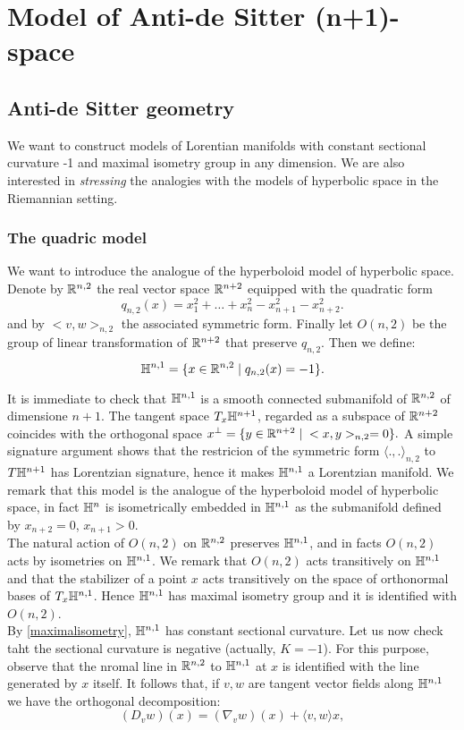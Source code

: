 \chapter{Model of Anti-de Sitter (n+1)-space}
\section{Anti-de Sitter geometry}
We want to construct models of Lorentian manifolds with constant sectional curvature -1 and maximal isometry group in any dimension. We are also interested in \textit{stressing} the analogies with the models of hyperbolic space in the Riemannian setting. 

\subsection{The quadric model}
We want to introduce the analogue of the hyperboloid model of hyperbolic space. Denote by $\mathbb{R}^{n,2}$ the real vector space $\mathbb{R}^{n+2}$ equipped with the quadratic form 
\[
    q_{n,2}(x)=x_1^{2}+\dots+x_n^{2}-x_{n+1}^{2}-x_{n+2}^2.   
\]
and by $<v,w>_{n,2}$ the associated symmetric form. Finally let $O(n,2)$ be the group of linear transformation of $\mathbb{R}^{n+2}$ that preserve $q_{n,2}.$
Then we define: 
\[
    \mathbb{H}^{n,1}=\{x\in \mathbb{R}^{n,2}\;|\;q_{n,2}(x)=-1\}.
\]

It is immediate to check that $\mathbb{H}^{n,1}$ is a smooth connected submanifold of $\mathbb{R}^{n,2}$ of dimensione $n+1$. The tangent space $T_x\mathbb{H}^{n+1}$, regarded as a subspace of $\mathbb{R}^{n+2}$ coincides with the orthogonal space $x^{\perp}=\{y\in \mathbb{R}^{n+2}\;|\;<x,y>_{n,2}=0\}.$ A simple signature argument shows that the restricion of the symmetric form $\langle .,. \rangle_{n,2}$ to $T\mathbb{H}^{n+1}$ has Lorentzian signature, hence it makes $\mathbb{H}^{n,1}$ a Lorentzian manifold. We remark that this model is the analogue of the hyperboloid model of hyperbolic space, in fact $\mathbb{H}^n$ is isometrically embedded in $\mathbb{H}^{n,1}$ as the submanifold defined by $x_{n+2}=0$, $x_{n+1}>0$. \\
The natural action of $O(n,2)$ on $\mathbb{R}^{n,2}$ preserves $\mathbb{H}^{n,1}$, and in facts $O(n,2)$ acts by isometries on $\mathbb{H}^{n,1}$. We remark that $O(n,2)$ acts transitively on $\mathbb{H}^{n,1}$ and that the stabilizer of a point $x$ acts transitively on the space of orthonormal bases of $T_x\mathbb{H}^{n,1}$. Hence $\mathbb{H}^{n,1}$ has maximal isometry group and it is identified with $O(n,2)$.\\
By \ref{maximalisometry}, $\mathbb{H}^{n,1}$ has constant sectional curvature. Let us now check taht the sectional curvature is negative (actually, $K=-1$). For this purpose, observe that the nromal line in $\mathbb{R}^{n,2}$ to $\mathbb{H}^{n,1}$ at $x$ is identified with the line generated by $x$ itself. It follows that, if $v,w$ are tangent vector fields along $\mathbb{H}^{n,1}$ we have the orthogonal decomposition: 
\[
    (D_{v}w)(x)=(\nabla_{v}w)(x)+\langle v,w\rangle x, 
\]

